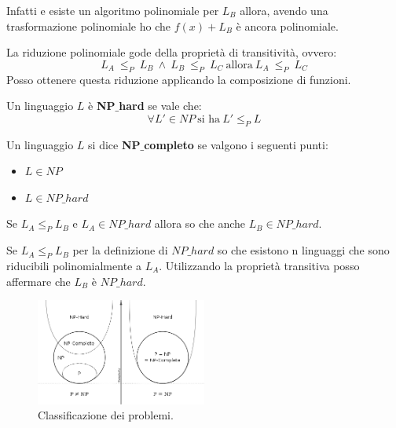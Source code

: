 \begin{dimostrazione}
    Infatti e esiste un algoritmo polinomiale per $L_B$ allora, avendo una
    trasformazione polinomiale ho che $f(x) + L_B$ è ancora polinomiale.
\end{dimostrazione}
\begin{teorema}
    La riduzione polinomiale gode della proprietà di transitività, ovvero:
    \begin{equation}
        L_A \ \leq_P \ L_B \ \land \ L_B \ \leq_P \ L_C \ \text{allora} \ L_A
        \ \leq_P \ L_C
    \end{equation}
    Posso ottenere questa riduzione applicando la composizione di funzioni.
\end{teorema}
\begin{definizione}
    Un linguaggio $L$ è \textbf{NP}$\_$\textbf{hard} se vale che:
    \begin{equation}
        \forall L' \in NP \ \text{si ha} \ L' \leq_P L
    \end{equation}
\end{definizione}
\begin{definizione}
    Un linguaggio $L$ si dice \textbf{NP}$\_$\textbf{completo} se valgono i
    seguenti punti:
    \begin{itemize}
        \item $L \in NP$
        \item $L \in NP\_hard$
    \end{itemize}
\end{definizione}
\begin{teorema}
    Se $L_A \leq_P L_B$ e $L_A \in NP\_hard$ allora so che anche $L_B \in NP\_hard$.
\end{teorema}
\begin{dimostrazione}
    Se $L_A \leq_P L_B$ per la definizione di $NP\_hard$ so che esistono n
    linguaggi che sono riducibili polinomialmente a $L_A$. Utilizzando la
    proprietà transitiva posso affermare che $L_B$ è $NP\_hard$.
\end{dimostrazione}
\begin{figure}[!ht]
    \centering
    \includegraphics[width=0.5\textwidth]{img/MacchineTuring/classificazioneProblemi.png}
    \caption{Classificazione dei problemi.}
\end{figure}

